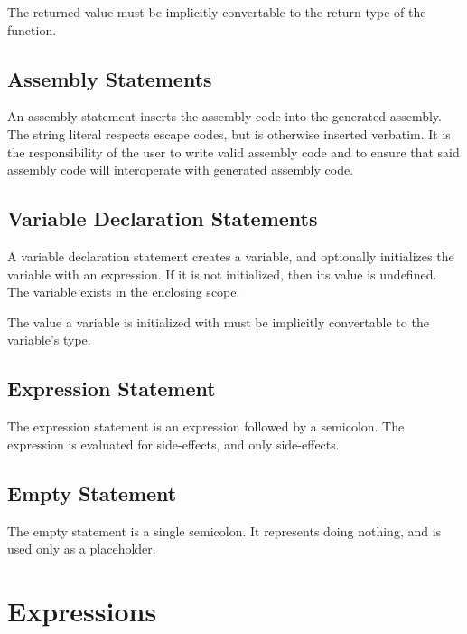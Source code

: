 \documentclass[letterpaper,12pt]{book}
\begin{document}
The returned value must be implicitly convertable to the return type of the function.

\section{Assembly Statements}



An assembly statement inserts the assembly code into the generated assembly. The string literal respects escape codes, but is otherwise inserted verbatim. It is the responsibility of the user to write valid assembly code and to ensure that said assembly code will interoperate with generated assembly code.

\section{Variable Declaration Statements}\label{section:Variable Declaration Statements}



A variable declaration statement creates a variable, and optionally initializes the variable with an expression. If it is not initialized, then its value is undefined. The variable exists in the enclosing scope.

The value a variable is initialized with must be implicitly convertable to the variable's type.

\section{Expression Statement}



The expression statement is an expression followed by a semicolon. The expression is evaluated for side-effects, and only side-effects.

\section{Empty Statement}

The empty statement is a single semicolon. It represents doing nothing, and is used only as a placeholder.

\chapter{Expressions}
\end{document}
